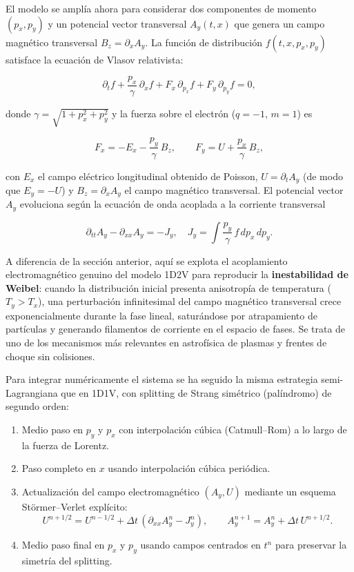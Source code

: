 \documentclass[11pt,a4paper,twoside,pdf]{article}
\numberwithin{equation}{section}
\begin{document}
El modelo se amplía ahora para considerar dos componentes de momento
$(p_x,p_y)$ y un potencial vector transversal $A_y(t,x)$ que genera un
campo magnético transversal $B_z = \partial_x A_y$. La función de
distribución $f(t,x,p_x,p_y)$ satisface la ecuación de Vlasov relativista:

\[
\partial_t f + \frac{p_x}{\gamma}\,\partial_x f
+ F_x\,\partial_{p_x} f + F_y\,\partial_{p_y} f = 0,
\]

donde $\gamma = \sqrt{1 + p_x^2 + p_y^2}$ y la fuerza sobre el electrón
($q=-1$, $m=1$) es

\[
F_x = -E_x - \frac{p_y}{\gamma}\,B_z, \qquad
F_y = U + \frac{p_x}{\gamma}\,B_z,
\]

con $E_x$ el campo eléctrico longitudinal obtenido de Poisson,
$U = \partial_t A_y$ (de modo que $E_y = -U$) y $B_z = \partial_x A_y$ el
campo magnético transversal. El potencial vector $A_y$ evoluciona según la
ecuación de onda acoplada a la corriente transversal

\[
\partial_{tt} A_y - \partial_{xx} A_y = - J_y,
\quad J_y = \int \frac{p_y}{\gamma}\, f\,dp_x\,dp_y.
\]

A diferencia de la sección anterior, aquí se explota el acoplamiento
electromagnético genuino del modelo 1D2V para reproducir la
\textbf{inestabilidad de Weibel}: cuando la distribución inicial presenta
anisotropía de temperatura ($T_y > T_x$), una perturbación infinitesimal
del campo magnético transversal crece exponencialmente durante la fase
lineal, saturándose por atrapamiento de partículas y generando filamentos
de corriente en el espacio de fases. Se trata de uno de los mecanismos más
relevantes en astrofísica de plasmas y frentes de choque sin colisiones.

Para integrar numéricamente el sistema se ha seguido la misma estrategia
semi-Lagrangiana que en 1D1V, con splitting de Strang simétrico
(palíndromo) de segundo orden:

\begin{enumerate}
    \item Medio paso en $p_y$ y $p_x$ con interpolación cúbica
    (Catmull--Rom) a lo largo de la fuerza de Lorentz.
    \item Paso completo en $x$ usando interpolación cúbica periódica.
    \item Actualización del campo electromagnético $(A_y,U)$ mediante un
    esquema Störmer--Verlet explícito:
    \[
    U^{n+1/2} = U^{n-1/2} + \Delta t\,(\partial_{xx}A_y^n - J_y^n),\qquad
    A_y^{n+1} = A_y^n + \Delta t\, U^{n+1/2}.
    \]
    \item Medio paso final en $p_x$ y $p_y$ usando campos centrados en
    $t^n$ para preservar la simetría del splitting.
\end{enumerate}
\end{document}
